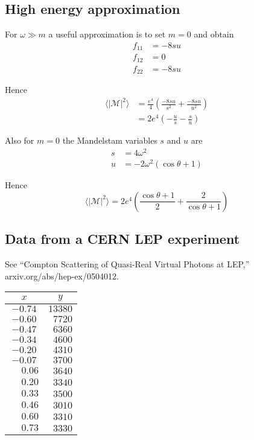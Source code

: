 \documentclass[12pt]{article}
\begin{document}
\subsection*{High energy approximation}
For $\omega\gg m$ a useful approximation is to set $m=0$ and obtain
\begin{align*}
f_{11}&=-8su
\\
f_{12}&=0
\\
f_{22}&=-8su
\end{align*}

Hence
\begin{align*}
\langle|\mathcal{M}|^2\rangle
&=\frac{e^4}{4}
\left(\frac{-8su}{s^2}+\frac{-8su}{u^2}\right)
\\
&=2e^4
\left(-\frac{u}{s}-\frac{s}{u}\right)
\end{align*}

Also for $m=0$ the Mandelstam variables $s$ and $u$ are
\begin{align*}
s&=4\omega^2
\\
u&=-2\omega^2(\cos\theta+1)
\end{align*}

Hence
\begin{equation*}
\langle|\mathcal{M}|^2\rangle
=2e^4\left(
\frac{\cos\theta+1}{2}+\frac{2}{\cos\theta+1}
\right)
\end{equation*}

\iffalse

\subsection*{Data from a CERN LEP experiment}
See ``Compton Scattering of Quasi-Real Virtual Photons at LEP,''
arxiv.org/abs/hep-ex/0504012.

\begin{center}
\begin{tabular}{|c|c|}
\hline
$x$ & $y$\\
\hline
$-0.74$ & $13380$\\
$-0.60$ & $\phantom{0}7720$\\
$-0.47$ & $\phantom{0}6360$\\
$-0.34$ & $\phantom{0}4600$\\
$-0.20$ & $\phantom{0}4310$\\
$-0.07$ & $\phantom{0}3700$\\
$\phantom{+}0.06$ & $\phantom{0}3640$\\
$\phantom{+}0.20$ & $\phantom{0}3340$\\
$\phantom{+}0.33$ & $\phantom{0}3500$\\
$\phantom{+}0.46$ & $\phantom{0}3010$\\
$\phantom{+}0.60$ & $\phantom{0}3310$\\
$\phantom{+}0.73$ & $\phantom{0}3330$\\
\hline
\end{tabular}
\end{center}
\end{document}
